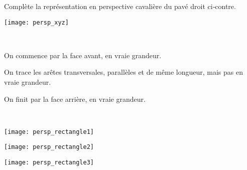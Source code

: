 \begin{methode*1}

 \begin{exemple*1}
 
 \begin{minipage}[c]{0.62\linewidth}
 Complète la représentation en perspective cavalière du pavé droit ci‑contre.
  \end{minipage} \hfill%
  \begin{minipage}[c]{0.32\linewidth} 
   \texttt{[image: persp\_xyz]}
   \end{minipage} \\[1.4em]
   
 \begin{minipage}[t]{0.32\linewidth}   
On commence par la face avant, en vraie grandeur.
  \end{minipage} \hfill%
  \begin{minipage}[t]{0.32\linewidth}
On trace les arêtes transversales, parallèles et de même longueur, mais pas en vraie grandeur.
  \end{minipage} \hfill%
   \begin{minipage}[t]{0.32\linewidth}   
On finit par la face arrière, en vraie grandeur.
   \end{minipage} \\
   
 \begin{minipage}[c]{0.3\linewidth}     
\begin{center} \texttt{[image: persp\_rectangle1]} \end{center}
  \end{minipage} \hfill%
  \begin{minipage}[c]{0.3\linewidth}
\begin{center} \texttt{[image: persp\_rectangle2]} \end{center}
  \end{minipage} \hfill%
   \begin{minipage}[c]{0.3\linewidth}   
\begin{center} \texttt{[image: persp\_rectangle3]} \end{center}
   \end{minipage} \\
 \end{exemple*1}


\end{methode*1}
